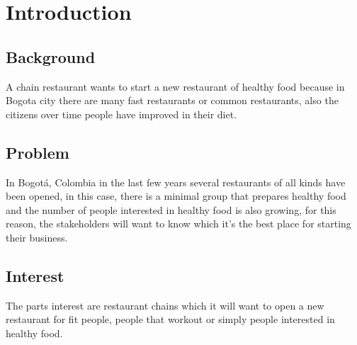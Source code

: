 {\justifying
	\chapter{Introduction}
	\vspace{2.5cm}
	\section{Background}
	A chain restaurant wants to start a new restaurant of healthy food because in Bogota city there are many fast restaurants or common restaurants, also the citizens over time people have improved in their diet.
	\section{Problem}
	In Bogotá, Colombia in the last few years several restaurants of all kinds have been opened, in this case, there is a minimal group that prepares healthy food and the number of people interested in healthy food is also growing, for this reason, the stakeholders will want to know which it's the best place for starting their business.
	\section{Interest}
	The parts interest are restaurant chains which it will want to open a new restaurant for fit people, people that workout or simply people interested in healthy food.
}\cleanalldata
